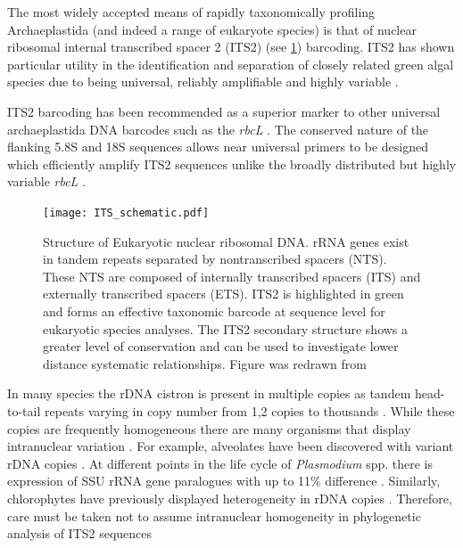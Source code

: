 The most widely accepted means of rapidly taxonomically profiling
Archaeplastida (and indeed a range of eukaryote species) is that of 
nuclear ribosomal internal transcribed spacer 2 (ITS2) (see \cref{fig:its2_schematic}) barcoding. 
ITS2 has shown particular utility in the identification and separation
of closely related green algal species \citep{Buchheim2011,Heeg2015} due to being
universal, reliably amplifiable and highly variable \citep{Hershkovitz1996}.

ITS2 barcoding has been recommended as a superior marker to 
other universal archaeplastida DNA barcodes such as the \textit{rbcL} 
\citep{Chen2010}.  The conserved nature of the flanking 5.8S and
18S sequences allows near universal primers to be designed which efficiently 
amplify ITS2 sequences unlike the broadly distributed but
highly variable \textit{rbcL} \citep{Buchheim2011}.

\begin{figure}[h]
    \texttt{[image: ITS\_schematic.pdf]}
    \caption[ITS2 structure overview]{Structure of Eukaryotic nuclear ribosomal DNA.
        rRNA genes exist in tandem repeats separated by nontranscribed spacers (NTS).
        These NTS are composed of internally transcribed spacers (ITS) and externally
        transcribed spacers (ETS).
        ITS2 is highlighted in green and forms an effective taxonomic barcode at sequence level 
        for eukaryotic species analyses.  The ITS2 secondary structure
        shows a greater level of conservation and can be used to investigate
        lower distance systematic relationships.  Figure was redrawn from \citep{Shi2005}}
\label{fig:its2_schematic}
\end{figure}

In many species the rDNA cistron is present in multiple copies
as tandem head-to-tail repeats varying in copy number from 1,2 copies
to thousands \citep{Torres-Machorro2010}.  While these copies are
frequently homogeneous there are many organisms that display
intranuclear variation \citep{Buchheim2011}.
For example, alveolates have been discovered with variant 
rDNA copies \citep{Stern2012,Galluzzi2004}. At 
different points in the life cycle of \textit{Plasmodium} spp. \citep{Nishimoto2008}
there is expression of SSU rRNA gene paralogues with up to 11\%
difference \citep{McCutchan1988,Chambouvet2015}.
Similarly, chlorophytes have previously displayed 
heterogeneity in rDNA copies \citep{Pillmann1997,Fama2000}.
Therefore, care must be taken not to assume intranuclear
homogeneity in phylogenetic analysis of ITS2 sequences \citep{Buchheim2011}


